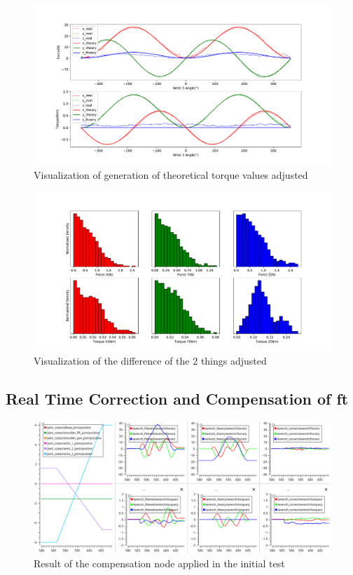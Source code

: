 
\begin{figure}[h]
    \centering
    \includegraphics[width=\linewidth]{figs/chp3/ft_sensor_theory_adjust.pdf}
    \caption{Visualization of generation of theoretical torque values adjusted}
    \label{fig:ft_sensor_theory_adjust}
\end{figure}

\begin{figure}[h]
    \centering
    \includegraphics[width=\linewidth]{figs/chp3/ft_sensor_theory_adjust_hist.pdf}
    \caption{Visualization of the difference of the 2 things adjusted}
    \label{fig:ft_sensor_theory_adjust_hist}
\end{figure}

\subsection{Real Time Correction and Compensation of \ac{ft}}

\begin{figure}[h]
    \centering
    \includegraphics[width=0.9\linewidth]{figs/chp3/ft_sensor_theory_result.png}
    \caption{Result of the compensation node applied in the initial test}
    \label{fig:ft_theory_result}
\end{figure}
